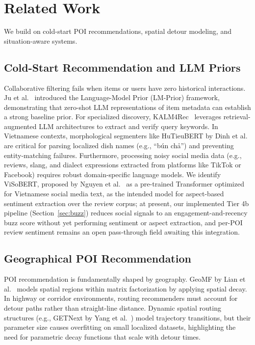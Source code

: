 \documentclass[acmsmall,screen]{acmart}
\begin{document}
\section{Related Work}
We build on cold-start POI recommendations, spatial detour modeling, and situation-aware systems.

\subsection{Cold-Start Recommendation and LLM Priors}
Collaborative filtering fails when items or users have zero historical interactions. Ju et al.~\cite{ju2024lmprior} introduced the Language-Model Prior (LM-Prior) framework, demonstrating that zero-shot LLM representations of item metadata can establish a strong baseline prior. For specialized discovery, KALM4Rec~\cite{kieu2024kalm4rec} leverages retrieval-augmented LLM architectures to extract and verify query keywords. In Vietnamese contexts, morphological segmenters like HuTieuBERT by Dinh et al.~\cite{dinh2026hutieubert} are critical for parsing localized dish names (e.g., ``bún chả'') and preventing entity-matching failures. Furthermore, processing noisy social media data (e.g., reviews, slang, and dialect expressions extracted from platforms like TikTok or Facebook) requires robust domain-specific language models. We identify ViSoBERT, proposed by Nguyen et al.~\cite{nguyen2023visobert} as a pre-trained Transformer optimized for Vietnamese social media text, as the intended model for aspect-based sentiment extraction over the review corpus; at present, our implemented Tier 4b pipeline (Section~\ref{sec:buzz}) reduces social signals to an engagement-and-recency buzz score without yet performing sentiment or aspect extraction, and per-POI review sentiment remains an open pass-through field awaiting this integration.

\subsection{Geographical POI Recommendation}
POI recommendation is fundamentally shaped by geography. GeoMF by Lian et al.~\cite{lian2014geomf} models spatial regions within matrix factorization by applying spatial decay. In highway or corridor environments, routing recommenders must account for detour paths rather than straight-line distance. Dynamic spatial routing structures (e.g., GETNext by Yang et al.~\cite{yang2022getnext}) model trajectory transitions, but their parameter size causes overfitting on small localized datasets, highlighting the need for parametric decay functions that scale with detour times.
\end{document}
